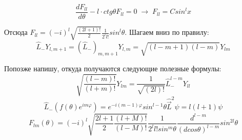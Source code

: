 $$\frac{d F_{ll}}{d \theta} - l \cdot ctg \theta F_{ll}=0 \; \rightarrow \; F_{ll}= C sin^{l}x$$
\par Отсюда $F_{ll}= (-i)^l \sqrt{\frac{(2l+1)!}{2}} \frac{1}{2^ll!} sin^l \theta$. Шагаем вниз по правилу:
$$\hat{L}_- Y_{l, m+1}= \left(\hat{L}_- \right)_{m, m+1}Y_{l,m}= \sqrt{(l-m+1)(l-m)} Y_{lm}$$
\par Попозже напишу, откуда получаются следующие полезные формулы:
$$\sqrt{\frac{(l-m)!}{(l+m)!}}Y_{lm}= \frac{1}{\sqrt{(2l)!}} \hat{L}^{l-m}_- Y_{ll}$$
$$\hat{L}_- \left(f(\theta)e^{im\varphi} \right) = e^{-i(m-1)\varphi}sin^{l-1}\theta \hat{\vec{L}}^2 \psi = l(l+1) \psi$$
$$F_{lm}(\theta)= (-i)^l \sqrt{\frac{2l+1}{2}\frac{(l+M)!}{(l-M)!}} \frac{1}{2^l l! sin^m \theta} \frac{d^{l-m}}{(dcos\theta)^{l-m}} sin^{2l}\theta$$